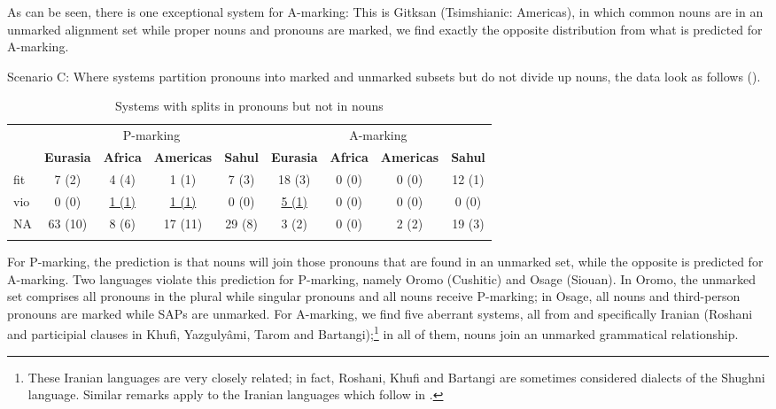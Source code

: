 \documentclass[output=paper]{langscibook}
\begin{document}
As can be seen, there is one exceptional system for A-marking: This is Gitksan (Tsimshianic: Americas), in which common nouns are in an unmarked alignment set while proper nouns and pronouns are marked, \ie we find exactly the opposite distribution from what is predicted for A-marking.

Scenario C: Where systems partition pronouns into marked and unmarked subsets but do not divide up nouns, the data look as follows ().

\begin{table}
\caption{Systems with splits in pronouns but not in nouns}
\label{18-sc-tab:6}
\begin{tabularx}{\textwidth}{Xcccccccc}
\lsptoprule
& \multicolumn{4}{c}{P-marking} & \multicolumn{4}{c}{A-marking}\\

& \bfseries Eurasia & \bfseries Africa & \bfseries Americas & \bfseries Sahul   & \bfseries Eurasia & \bfseries Africa & \bfseries Americas & \bfseries Sahul\\
\midrule
fit & 7  (2)& 4 (4) & 1 (1) & 7 (3) &  18 (3) & 0 (0) & 0 (0) & 12 (1)\\
vio & 0 (0) & \underline{1 (1)} & \underline{1 (1)}& 0 (0) & \underline{5 (1)} & 0 (0) & 0 (0) & 0 (0)\\
NA & 63 (10) & 8 (6) & 17 (11) & 29 (8)  & 3  (2)& 0 (0) & 2  (2) & 19 (3)\\
\lspbottomrule
\end{tabularx}
\end{table}

\noindent For P-marking, the prediction is that nouns will join those pronouns that are found in an unmarked set, while the opposite is predicted for A-marking. Two languages violate this prediction for P-marking, namely Oromo (Cushitic) and Osage (Siouan). In Oromo, the unmarked set comprises all pronouns in the plural while singular pronouns and all nouns receive P-marking; in Osage, all nouns and third-person pronouns are marked while SAPs are unmarked. For A-marking, we find five aberrant systems, all from  and specifically Iranian (Roshani and participial clauses in Khufi, Yazgulyâmi, Tarom and Bartangi);\footnote{These Iranian languages are very closely related; in fact, Roshani, Khufi and Bartangi are sometimes considered dialects of the Shughni language. Similar remarks apply to the Iranian languages which follow in .} in all of them, nouns join an unmarked grammatical relationship.
\end{document}
